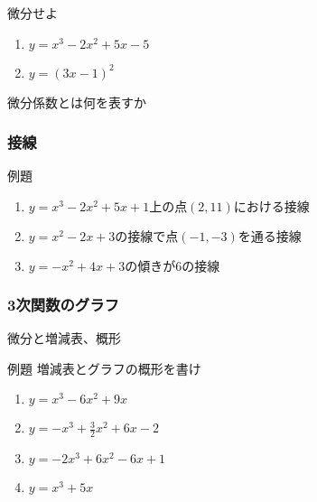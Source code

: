 \documentclass[10pt,dvipdfmx]{jsarticle}
\begin{document}
\begin{itembox}[l]{微分せよ}
  \begin{large}
    \begin{multicols}{2}
      \begin{enumerate}
        \item $y=x^3-2x^2+5x-5$
        \item $y=(3x-1)^2$
      \end{enumerate}
    \end{multicols}
  \end{large}
\end{itembox}

\begin{itembox}[l]{微分係数とは何を表すか}
  \vspace{8mm}
\end{itembox}

\subsubsection*{接線}
\begin{itembox}[l]{例題}
  \begin{large}
    \begin{enumerate}
      \item $y=x^3-2x^2+5x+1上の点(2,11)における接線$
      \item $y=x^2-2x+3の接線で点(-1,-3)を通る接線$
      \item $y=-x^2+4x+3の傾きが6の接線$
    \end{enumerate}
  \end{large}
\end{itembox}


\subsubsection*{3次関数のグラフ}
\begin{itembox}[l]{微分と増減表、概形}
  \vspace{10mm}
\end{itembox}

\begin{itembox}[l]{例題}
  増減表とグラフの概形を書け
  \begin{large}
    \begin{enumerate}
      \item $y=x^3-6x^2+9x$\vspace{15mm}
      \item $y=-x^3+\frac{3}{2}x^2+6x-2$\vspace{15mm}
      \item $y=-2x^3+6x^2-6x+1$\vspace{15mm}
      \item $y=x^3+5x$\vspace{15mm}
    \end{enumerate}
  \end{large}
\end{itembox}
\end{document}
